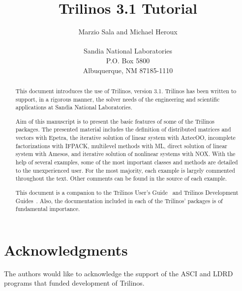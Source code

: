 \documentclass[12pt,relax]{SANDreport}
\author{Marzio Sala and Michael Heroux \\
 \\
Sandia National Laboratories \\
P.O. Box 5800 \\
Albuquerque, NM 87185-1110
}
\title{Trilinos 3.1 Tutorial}
\newcommand{\Trilinos}{Trilinos}
\begin{document}
\maketitle

\begin{abstract}
  
  This document introduces the use of \Trilinos{}, version 3.1.
  \Trilinos{} has been written to support, in a rigorous manner, the
  solver needs of the engineering and scientific applications at Sandia
  National Laboratories.

  \medskip
  
  Aim of this manuscript is to present the basic features of some of the
  Trilinos packages. The presented material includes the definition of
  distributed matrices and vectors with Epetra, the iterative solution
  of linear system with AztecOO, incomplete factorizations with IFPACK,
  multilevel methods with ML, direct solution of linear system with
  Amesos, and iterative solution of nonlinear systems with NOX. With the
  help of several examples, some of the most important classes and
  methods are detailed to the unexperienced user.  For the most
  majority, each example is largely commented throughout the text. Other
  comments can be found in the source of each example.

  \medskip
  
  This document is a companion to the Trilinos User's
  Guide~\cite{Trilinos-Users-Guide} and Trilinos Development
  Guides~\cite{Trilinos-Dev-Guide,Trilinos-Dev-Guide-II}. Also, the
  documentation included in each of the Trilinos' packages is of
  fundamental importance.
 
\end{abstract}

\clearpage
\section*{Acknowledgments}
The authors would like to acknowledge the support of the ASCI and LDRD programs
that funded development of Trilinos.

\clearpage

\SANDmain

\tableofcontents

\clearpage

























\end{document}
